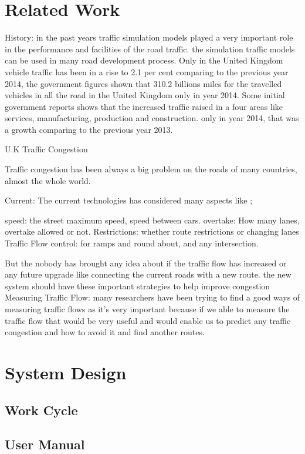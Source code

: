 \documentclass[11pt]{article}
\begin{document}
	\section{Related Work} %
	
	History: 
in the past years traffic simulation models played a very important role in the performance and facilities of the road traffic. the simulation traffic models can be used in many road development process.
Only in the United Kingdom vehicle traffic has been in a rise to 2.1 per cent comparing to the previous year 2014, the government figures shown that 310.2 billions miles for the travelled vehicles in all the road in the United Kingdom only in year 2014.  
Some initial government reports shows that the increased traffic raised in a four areas like services, manufacturing, production and construction. only in year 2014, that was a growth comparing to the previous year 2013.

U.K Traffic Congestion 

Traffic congestion has been always a big problem on the roads of many countries, almost the whole world. 


Current: 
The current technologies has considered many aspects like ;

speed: the street maximum speed, speed between cars. 
overtake: How many lanes, overtake allowed or not.
Restrictions: whether route restrictions or changing lanes 
Traffic Flow control: for ramps and round about, and any intersection.

But the nobody has brought any idea about if the traffic flow has increased or any future upgrade like connecting the current roads with a new route. the new system should have these important strategies to help improve congestion 
Measuring Traffic Flow: many researchers have been trying to find a good ways of measuring traffic flows as it’s very important because if we able to measure the traffic flow that would be very useful and would enable us to predict any traffic congestion and how to avoid it and find another routes. 
	\section{System Design}
	\subsection{Work Cycle}
	\subsection{User Manual}
\end{document}
